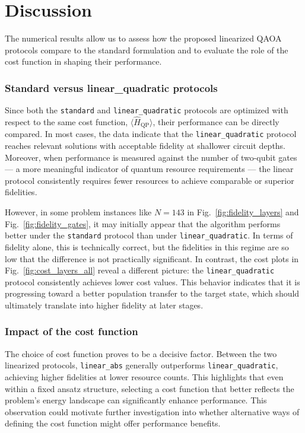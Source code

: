 \chapter{Discussion}
\label{Chapter:Discussion}

The numerical results allow us to assess how the proposed linearized QAOA protocols compare to the standard formulation and to evaluate the role of the cost function in shaping their performance.

\subsection*{Standard versus linear\_quadratic protocols}

Since both the \texttt{standard} and \texttt{linear\_quadratic} protocols are optimized with respect to the same cost function, $\langle \hat{H}_\mathrm{QP} \rangle$, their performance can be directly compared. In most cases, the data indicate that the \texttt{linear\_quadratic} protocol reaches relevant solutions with acceptable fidelity at shallower circuit depths. Moreover, when performance is measured against the number of two-qubit gates --- a more meaningful indicator of quantum resource requirements --- the linear protocol consistently requires fewer resources to achieve comparable or superior fidelities.

However, in some problem instances like $N=143$ in Fig.~\ref{fig:fidelity_layers} and Fig.~\ref{fig:fidelity_gates}, it may initially appear that the algorithm performs better under the \texttt{standard} protocol than under \texttt{linear\_quadratic}. In terms of fidelity alone, this is technically correct, but the fidelities in this regime are so low that the difference is not practically significant. In contrast, the cost plots in Fig.~\ref{fig:cost_layers_all} reveal a different picture: the \texttt{linear\_quadratic} protocol consistently achieves lower cost values. This behavior indicates that it is progressing toward a better population transfer to the target state, which should ultimately translate into higher fidelity at later stages.

\subsection*{Impact of the cost function}

The choice of cost function proves to be a decisive factor. Between the two linearized protocols, \texttt{linear\_abs} generally outperforms \texttt{linear\_quadratic}, achieving higher fidelities at lower resource counts. This highlights that even within a fixed ansatz structure, selecting a cost function that better reflects the problem's energy landscape can significantly enhance performance. This observation could motivate further investigation into whether alternative ways of defining the cost function might offer performance benefits.

